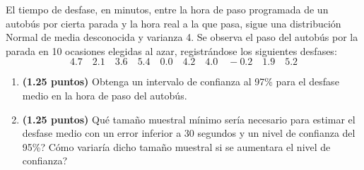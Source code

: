 
El tiempo de desfase, en minutos, entre la hora de paso programada de un
autobús por cierta parada y la hora real a la que pasa, sigue una distribución
Normal de media desconocida y varianza 4. Se observa el paso del autobús
por la parada en 10 ocasiones elegidas al azar, registrándose los siguientes
desfases:
\[
4.7\quad 2.1\quad 3.6\quad 5.4\quad 0.0\quad 4.2\quad 4.0\quad
-0.2\quad 1.9\quad 5.2
\]
\begin{enumerate}[label=\alph*)]
  \item \textbf{(1.25 puntos)} Obtenga un intervalo de confianza al 97\%
  para el desfase medio en la hora de paso del autobús.
  \item \textbf{(1.25 puntos)} \textquestiondown{}Qué tamaño muestral mínimo
  sería necesario para estimar el desfase medio con un error inferior a
  30 segundos y un nivel de confianza del 95\%? \textquestiondown{}Cómo
  variaría dicho tamaño muestral si se aumentara el nivel de confianza?
\end{enumerate}
